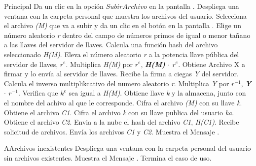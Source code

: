 \begin{UCtrayectoria}{Principal}
	\UCpaso[\UCactor] Da un clic en la opción $Subir Archivo$ en la pantalla .
	\UCpaso Despliega una ventana con la carpeta personal que muestra los archivos del usuario. 
	\UCpaso[\UCactor] Selecciona el archivo \textit{(M)} que va a subir y da un clic en el botón \IUbuttonAceptar en la pantalla . 
	\UCpaso Elige un número aleatorio \textit{r} dentro del campo de números primos de igual o menor tañano a las llaves del servidor de llaves.  \label{CUCL2Regreso}
	\UCpaso Calcula una función hash del archivo seleccionado \textit{H(M)}.
	\UCpaso Eleva el número aleatorio \textit{r} a la potencia llave pública del servidor de llaves,  \textit{$r^{e}$}. 
	\UCpaso Multiplica \textit{H(M)} por \textit{$r^{e}$}, \textbf{\textit{H(M)} $\cdot$ \textit{$r^{e}$}}.
	\UCpaso Obtiene Archivo X a firmar y lo envía al servidor de llaves.
	\UCpaso Recibe la firma a ciegas \textit{Y} del servidor.
	\UCpaso Calcula el inverso multiplikcativo del numero aleatorio \textit{r}.
	\UCpaso Multiplica \textit{Y} por \textit{$r^{-1}$}, \textbf{\textit{Y} $\cdot$ \textit{$r^{-1}$}}.
	\UCpaso Verifica que \textit{$k^{e}$} sea igual a \textit{H(M)}.  
	\UCpaso Obtiene llave \textit{k} y la almacena, junto con el nombre del achivo al que le corresponde.
	\UCpaso Cifra el archivo \textit{(M)} con su llave \textit{k}.
	\UCpaso Obtiene el archivo \textit{C1}.
	\UCpaso Cifra el archivo \textit{k} con su llave publica del usuario \textit{ka}.
	\UCpaso Obtiene el archivo \textit{C2}.
	\UCpaso Envia a la nube el hash del archivo \textit{C1}, \textit{H(C1)}.
	\UCpaso Recibe solicitud de archivos. 
	\UCpaso Envía los archivos \textit{C1} y \textit{C2}.
	\UCpaso Muestra el Mensaje . \label{CUCL2Regreso2}
	

\end{UCtrayectoria}


		
\begin{UCtrayectoriaA}{A}{Archivos inexistentes}
	\UCpaso Despliega una ventana con la carpeta personal del usuario sin archivos existentes.
	\UCpaso Muestra el Mensaje .
	\UCpaso Termina el caso de uso.
\end{UCtrayectoriaA}

